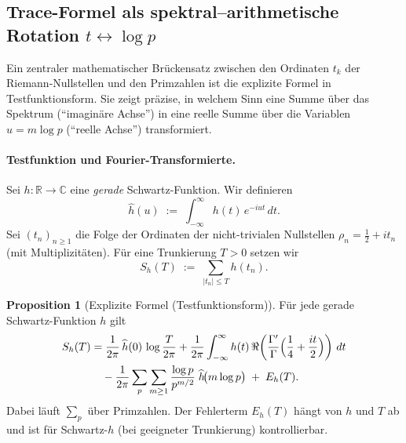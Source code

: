 \documentclass[11pt,a4paper]{article}
\theoremstyle{definition}
\newtheorem{proposition}{Proposition}[section]
\begin{document}
\subsection{Trace-Formel als spektral--arithmetische Rotation \texorpdfstring{$t \leftrightarrow \log p$}{t <-> log p}}
\label{sec:trace_formula}
Ein zentraler mathematischer Brückensatz zwischen den Ordinaten $t_k$ der Riemann-Nullstellen
und den Primzahlen ist die explizite Formel in Testfunktionsform. Sie zeigt präzise,
in welchem Sinn eine Summe über das Spektrum (``imaginäre Achse'') in eine reelle Summe
über die Variablen $u=m\log p$ (``reelle Achse'') transformiert.

\paragraph{Testfunktion und Fourier-Transformierte.}
Sei $h:\mathbb{R}\to\mathbb{C}$ eine \emph{gerade} Schwartz-Funktion. Wir definieren
\[
\widehat h(u)\;:=\;\int_{-\infty}^{\infty} h(t)\,e^{-iut}\,dt.
\]
Sei $(t_n)_{n\ge 1}$ die Folge der Ordinaten der nicht-trivialen Nullstellen
$\rho_n=\tfrac12+it_n$ (mit Multiplizitäten). Für eine Trunkierung $T>0$ setzen wir
\[
S_h(T)\;:=\;\sum_{|t_n|\le T} h(t_n).
\]

\begin{proposition}[Explizite Formel (Testfunktionsform)]
\label{prop:explicit_QZG_de}
Für jede gerade Schwartz-Funktion $h$ gilt
\begin{align}
S_h(T)
&=\frac{1}{2\pi}\,\widehat h(0)\,\log\frac{T}{2\pi}
+\frac{1}{2\pi}\int_{-\infty}^{\infty} h(t)\,
\Re\!\left(\frac{\Gamma'}{\Gamma}\Bigl(\frac14+\frac{it}{2}\Bigr)\right)\,dt \notag\\
&\quad-\frac{1}{2\pi}\sum_{p}\sum_{m\ge 1}\frac{\log p}{p^{m/2}}\;\widehat h\!\bigl(m\log p\bigr)
\;+\;E_h(T).
\label{eq:explicit_QZG_de}
\end{align}
Dabei läuft $\sum_p$ über Primzahlen. Der Fehlerterm $E_h(T)$ hängt von $h$ und $T$ ab und ist
für Schwartz-$h$ (bei geeigneter Trunkierung) kontrollierbar.
\end{proposition}
\end{document}
